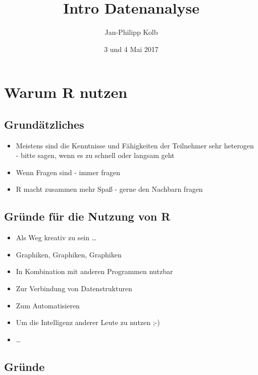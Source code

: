 \documentclass[]{article}
\title{Intro Datenanalyse}
\author{Jan-Philipp Kolb}
\date{3 und 4 Mai 2017}
\providecommand{\tightlist}{%
  \setlength{\itemsep}{0pt}\setlength{\parskip}{0pt}}
\begin{document}
\maketitle

{
\setcounter{tocdepth}{2}
\tableofcontents
}
\section{Warum R nutzen}\label{warum-r-nutzen}

\subsection{Grundätzliches}\label{grundatzliches}

\begin{itemize}
\tightlist
\item
  Meistens sind die Kenntnisse und Fähigkeiten der Teilnehmer sehr
  heterogen - bitte sagen, wenn es zu schnell oder langsam geht
\item
  Wenn Fragen sind - immer fragen
\item
  R macht zusammen mehr Spaß - gerne den Nachbarn fragen
\end{itemize}

\subsection{Gründe für die Nutzung von
R}\label{grunde-fur-die-nutzung-von-r}

\begin{itemize}
\tightlist
\item
  Als Weg kreativ zu sein \ldots{}
\item
  Graphiken, Graphiken, Graphiken
\item
  In Kombination mit anderen Programmen nutzbar
\item
  Zur Verbindung von Datenstrukturen
\item
  Zum Automatisieren
\item
  Um die Intelligenz anderer Leute zu nutzen ;-)
\item
  \ldots{}
\end{itemize}

\subsection{Gründe}\label{grunde}
\end{document}
